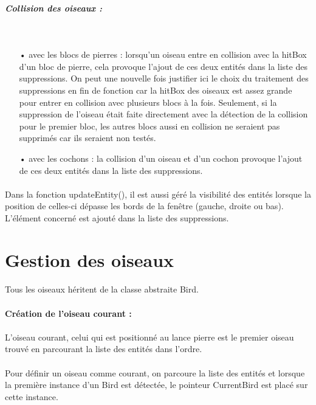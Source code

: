 \documentclass[a4paper,12pt]{report}
\begin{document}
\subparagraph{Collision des oiseaux :}
~\\
\begin{itemize}
\item[•] avec les blocs de pierres : lorsqu'un oiseau entre en collision avec la hitBox d'un bloc de pierre, cela provoque l'ajout de ces deux entités dans la liste des suppressions. On peut une nouvelle fois justifier ici le choix du traitement des suppressions en fin de fonction car la hitBox des oiseaux est assez grande pour entrer en collision avec plusieurs blocs à la fois. Seulement, si la suppression de l'oiseau était faite directement avec la détection de la collision pour le premier bloc, les autres blocs aussi en collision ne seraient pas supprimés car ils seraient non testés.
\item[•] avec les cochons : la collision d'un oiseau et d'un cochon provoque l'ajout de ces deux entités dans la liste des suppressions.
\end{itemize}

\paragraph{}Dans la fonction updateEntity(), il est aussi géré la visibilité des entités lorsque la position de celles-ci dépasse les bords de la fenêtre (gauche, droite ou bas). L'élément concerné est ajouté dans la liste des suppressions.

\section{Gestion des oiseaux}

\paragraph{}Tous les oiseaux héritent de la classe abstraite Bird. 

\paragraph{Création de l'oiseau courant :}

\paragraph{}L'oiseau courant, celui qui est positionné au lance pierre est le premier oiseau trouvé en parcourant la liste des entités dans l'ordre.

\paragraph{}Pour définir un oiseau comme courant, on parcoure la liste des entités et lorsque la première instance d'un Bird est détectée, le pointeur CurrentBird est placé sur cette instance.
\end{document}
